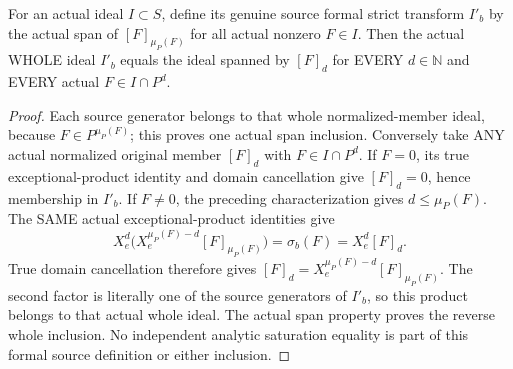 \begin{theorem}
\label{hir:actual-formal-strict-ideal-normalized-member-identification}
For an actual ideal $I\subset S$, define its genuine source formal
strict transform $I'_b$ by the actual span of
$[F]_{\mu_P(F)}$ for all actual nonzero $F\in I$.
Then the actual WHOLE ideal $I'_b$ equals the ideal spanned by
$[F]_d$ for EVERY $d\in\mathbb N$ and EVERY actual $F\in I\cap P^d$.
\leanok
\end{theorem}
\begin{proof}
Each source generator belongs to that whole normalized-member ideal,
because $F\in P^{\mu_P(F)}$; this proves one actual span inclusion.
Conversely take ANY actual normalized original member $[F]_d$ with
$F\in I\cap P^d$. If $F=0$, its true exceptional-product identity
and domain cancellation give $[F]_d=0$, hence membership in $I'_b$.
If $F\ne0$, the preceding characterization gives $d\le\mu_P(F)$.
The SAME actual exceptional-product identities give
\[
 X_e^d\bigl(X_e^{\mu_P(F)-d}[F]_{\mu_P(F)}\bigr)=\sigma_b(F)
 =X_e^d[F]_d.
\]
True domain cancellation therefore gives
$[F]_d=X_e^{\mu_P(F)-d}[F]_{\mu_P(F)}$. The second factor is literally
one of the source generators of $I'_b$, so this product belongs to that
actual whole ideal. The actual span property proves the reverse whole
inclusion. No independent analytic saturation equality is part of this
formal source definition or either inclusion.
\end{proof}

